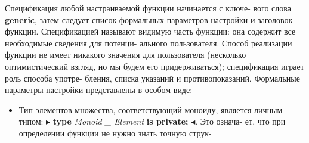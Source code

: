 Спецификация любой настраиваемой функции начинается с ключе­-\linebreak
вого слова {\bf generic}, затем следует список формальных параметров\linebreak
настройки и заголовок функции. Спецификацией называют видимую\linebreak
часть функции: она содержит все необходимые сведения для потенци­-\linebreak
ального пользователя. Способ реализации функции не имеет никакого\linebreak
значения для пользователя (несколько оптимистический взгляд, но мы\linebreak
будем его придерживаться); спецификация играет роль способа употре­-\linebreak
бления, списка указаний и противопоказаний. Формальные параметры\linebreak
настройки представлены в особом виде:
\begin{itemize}
\item Тип элементов множества, соответствующий моноиду, является\linebreak
личным типом: $\blacktriangleright$ {\bf type} {\it Monoid \_  Element} {\bf is private;} $\blacktriangleleft$. Это означа­-\linebreak
ет, что при определении функции не нужно знать точную струк-
\end{itemize}


